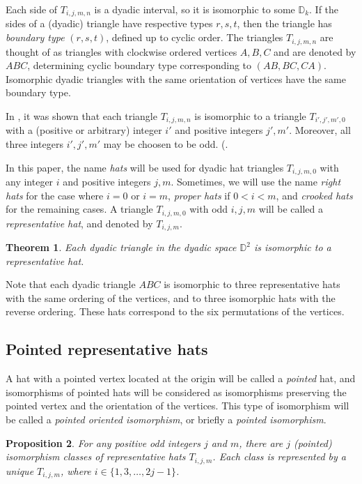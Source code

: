 \documentclass[12pt]{amsart}
\def\mbD{\mathbb{D}}
\theoremstyle{plain}
\newtheorem{theorem}{Theorem}[section]
\newtheorem{proposition}[theorem]{Proposition}
\theoremstyle{definition}
\numberwithin{equation}{section}
\begin{document}
Each side of $T_{i,j,m,n}$ is a dyadic interval, so it is isomorphic
to some $\mbD_k$. If the sides of a (dyadic) triangle have respective
types $r, s, t$, then the triangle has \emph{boundary type} $(r,s,t)$, defined up to cyclic order. The triangles $T_{i,j,m,n}$ are thought of as triangles with clockwise ordered vertices $A, B, C$ and are denoted by $ABC$, determining cyclic boundary type corresponding to $(AB,BC,CA)$.  Isomorphic dyadic triangles with the same orientation of vertices have the same boundary type.

In \cite[Prop.~4.5]{MR25}, it was shown that each triangle $T_{i,j,m,n}$ is isomorphic to a triangle $T_{i',j',m',0}$ with a (positive or arbitrary) integer $i'$ and positive integers $j', m'$. Moreover, all three integers $i', j', m'$ may be choosen to be odd. (\cite[Prop.~4.11]{MR25}.

In this paper, the name \emph{hats} will be used for dyadic hat triangles $T_{i,j,m,0}$ with any integer $i$ and positive integers $j, m$. Sometimes, we will use the name \emph{right hats} for the case where $i = 0$ or $i = m$, \emph{proper hats} if $0 < i < m$, and \emph{crooked hats} for the remaining cases.
A triangle $T_{i,j,m,0}$ with odd $i, j, m$ will be called a \emph{representative hat},  and denoted by $T_{i,j,m}$.

\begin{theorem}\cite[Thm.~4.13]{MR25}\label{T:reprhats}
Each dyadic triangle in the dyadic space $\mbD^2$ is isomorphic to a representative hat.
\end{theorem}


Note that each dyadic triangle $ABC$ is isomorphic to three
representative hats with the same ordering of the vertices, and to three isomorphic hats with the
reverse ordering. These hats correspond to the six permutations of the vertices.

\subsection{Pointed representative hats}

A hat with a pointed vertex located at the
origin will be called a \emph{pointed} hat, and isomorphisms of pointed hats will be considered as isomorphisms preserving the pointed vertex
and the orientation of the vertices. This type of isomorphism will be called a \emph{pointed
oriented isomorphism}, or briefly a \emph{pointed isomorphism}.

\begin{proposition}\cite[Cor.~5.3]{MR25}\label{C:nonisomhats}
For any positive odd integers $j$ and $m$, there are $j$  (pointed) isomorphism classes of
representative hats $T_{i,j,m}$. Each class is represented by a unique $T_{i,j,m}$, where $i \in \{1,3,\dots, 2j-1\}$.
\end{proposition}
\end{document}
